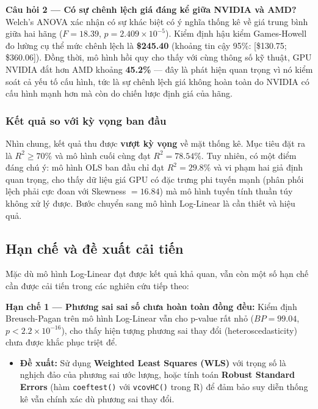 \documentclass[a4paper]{article}
\begin{document}
\textbf{Câu hỏi 2 --- Có sự chênh lệch giá đáng kể giữa NVIDIA và AMD?} Welch's ANOVA xác nhận có sự khác biệt có ý nghĩa thống kê về giá trung bình giữa hai hãng ($F = 18.39$, $p = 2.409 \times 10^{-5}$). Kiểm định hậu kiểm Games-Howell đo lường cụ thể mức chênh lệch là \textbf{\$245.40} (khoảng tin cậy 95\%: [\$130.75; \$360.06]). Đồng thời, mô hình hồi quy cho thấy với cùng thông số kỹ thuật, GPU NVIDIA đắt hơn AMD khoảng \textbf{45.2\%} --- đây là phát hiện quan trọng vì nó kiểm soát cả yếu tố cấu hình, tức là sự chênh lệch giá không hoàn toàn do NVIDIA có cấu hình mạnh hơn mà còn do chiến lược định giá của hãng.

\subsubsection{Kết quả so với kỳ vọng ban đầu}

Nhìn chung, kết quả thu được \textbf{vượt kỳ vọng} về mặt thống kê. Mục tiêu đặt ra là $R^2 \geq 70\%$ và mô hình cuối cùng đạt $R^2 = 78.54\%$. Tuy nhiên, có một điểm đáng chú ý: mô hình OLS ban đầu chỉ đạt $R^2 = 29.8\%$ và vi phạm hai giả định quan trọng, cho thấy dữ liệu giá GPU có đặc trưng phi tuyến mạnh (phân phối lệch phải cực đoan với Skewness $= 16.84$) mà mô hình tuyến tính thuần túy không xử lý được. Bước chuyển sang mô hình Log-Linear là cần thiết và hiệu quả.

\subsection{Hạn chế và đề xuất cải tiến}

Mặc dù mô hình Log-Linear đạt được kết quả khả quan, vẫn còn một số hạn chế cần được cải tiến trong các nghiên cứu tiếp theo:

\textbf{Hạn chế 1 --- Phương sai sai số chưa hoàn toàn đồng đều:} Kiểm định Breusch-Pagan trên mô hình Log-Linear vẫn cho p-value rất nhỏ ($BP = 99.04$, $p < 2.2 \times 10^{-16}$), cho thấy hiện tượng phương sai thay đổi (heteroscedasticity) chưa được khắc phục triệt để.
\begin{itemize}
    \item \textbf{Đề xuất:} Sử dụng \textbf{Weighted Least Squares (WLS)} với trọng số là nghịch đảo của phương sai ước lượng, hoặc tính toán \textbf{Robust Standard Errors} (hàm \texttt{coeftest()} với \texttt{vcovHC()} trong R) để đảm bảo suy diễn thống kê vẫn chính xác dù phương sai thay đổi.
\end{itemize}
\end{document}
